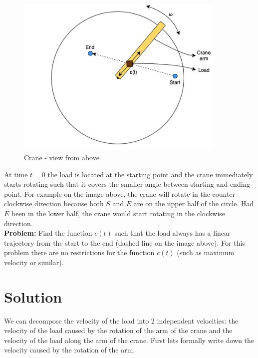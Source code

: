 \documentclass[11pt]{article}
\begin{document}
\begin{figure}[H]
\centering
\includegraphics[width=10cm]{crane.jpg}
\caption{Crane - view from above}\label{crane}
\end{figure}

At time $t=0$ the load is located at the starting point and the crane immediately starts rotating such that it covers the smaller angle between starting and ending point. For example on the image above, the crane will rotate in the counter clockwise direction because both $S$ and $E$ are on the upper half of the circle. Had $E$ been in the lower half, the crane would start rotating in the clockwise direction. \\

\textbf{Problem:} Find the function $c(t)$ such that the load always has a linear trajectory from the start to the end (dashed line on the image above). For this problem there are no restrictions for the function $c(t)$ (such as maximum velocity or similar).

\section{Solution}

We can decompose the velocity of the load into 2 independent velocities: the velocity of the load caused by the rotation of the arm of the crane and the velocity of the load along the arm of the crane. First lets formally write down the velocity caused by the rotation of the arm.\\
\end{document}
